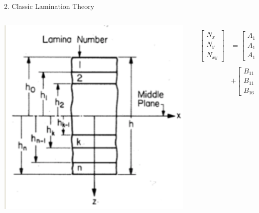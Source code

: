 \documentclass{beamer}
\begin{document}
\begin{frame}{2. Classic Lamination Theory}
\begin{columns}[c]
\begin{column}{0.5\textwidth}
        \includegraphics[width=0.8\linewidth]{GA_images/composite-material.png}
    \end{column}
	\begin{column}{0.5\textwidth}
		\begin{equation} \label{eq:force_and_moments}
			\begin{array}{l}
				\begin{aligned}
			\begin{bmatrix}
				N_x \\
				N_y \\
				N_{xy}
			\end{bmatrix}
			&=
			\begin{bmatrix}
				A_{11} & A_{12} & A_{16} \\
				A_{12} & A_{22} & A_{26} \\
				A_{16} & A_{26} & A_{66} 
			\end{bmatrix}
			\begin{bmatrix}
				\varepsilon_x^0 \\
				\varepsilon_y^0 \\
				\gamma_{xy}^0
			\end{bmatrix}   \\
			&+               
			\begin{bmatrix}
				B_{11} & B_{12} & B_{16} \\
				B_{11} & B_{12} & B_{16} \\
				B_{16} & B_{26} & B_{66} 
			\end{bmatrix}

\end{aligned}
\end{array}
\end{equation}
\end{column}
\end{columns}
\end{frame}
\end{document}
